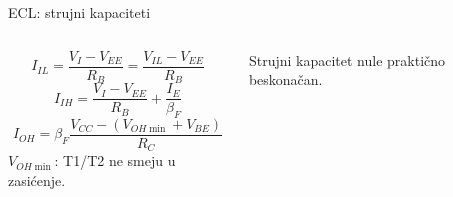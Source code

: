 \begin{frame}[label=10-s091]{ECL: strujni kapaciteti}
\setlength{\abovedisplayskip}{4pt}\setlength{\belowdisplayskip}{4pt}\setlength{\abovedisplayshortskip}{3pt}\setlength{\belowdisplayshortskip}{3pt}
\begin{columns}[T,onlytextwidth]\centering \raggedright{}
\[I_{IL}=\frac{V_I-V_{EE}}{R_B}=\frac{V_{IL}-V_{EE}}{R_B}\]
\[I_{IH}=\frac{V_I-V_{EE}}{R_B}+\frac{I_E}{\beta_F}\]
\[I_{OH}=\beta_F\frac{V_{CC}-(V_{OH\min}+V_{BE})}{R_C}\]
$V_{OH\min}$: T1/T2 ne smeju u zasićenje.\par\medskip
Strujni kapacitet nule praktično beskonačan.\end{columns}
\end{frame}

